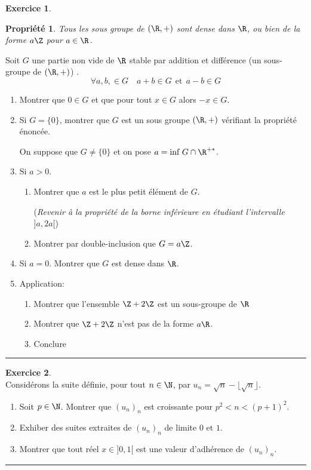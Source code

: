 \documentclass[a4paper,11pt]{article}
\newtheorem{prop}{Propriété}
\theoremstyle{definition}
\newtheorem{exo}{Exercice} %
\begin{document}
		\begin{exo}%
		\begin{prop}
			\textit{Tous les sous groupe de} $(\R, +)$ \textit{sont dense dans $\R$, ou bien de la forme} $a\Z$ \textit{pour} $a\in \R$.\\
		\end{prop}
		
		Soit $G$ une partie non vide de $\R$ stable par addition et diﬀérence (un sous-groupe de $(\R, +)$) .\hfil\\[-0.5cm] $$\forall a,b,\in G \quad a+b \in G \ \  \text{et} \ \ a-b \in G$$
		\begin{enumerate}
			\item Montrer que $0\in G$ et que pour tout $x\in G$ alors $-x\in G$.
			\item Si $G = \{0\}$, montrer que $G$ est un sous groupe $(\R, +)$ vérifiant la propriété énoncée.
			
			On suppose que $G \neq \{0\}$ et on pose $a = \text{inf } G\cap \R^{+*}$.
			\item Si $a>0$.
			\begin{enumerate}
				\item Montrer que $a$ est le plus petit élément de $G$. 
				
				(\textit{Revenir à la propriété de la borne inférieure en étudiant l'intervalle} $]a,2a[$)
				\item Montrer par double-inclusion que $G = a\Z$.
			\end{enumerate}
			\item Si $a=0$. Montrer que $G$ est dense dans $\R$.
			\item Application:
			\begin{enumerate}
				\item Montrer que l'ensemble $\Z + 2\Z$ est un sous-groupe de $\R$
				\item Montrer que $\Z + 2\Z$ n'est pas de la forme $a\R$.
				\item Conclure 
			\end{enumerate}
			
		\end{enumerate}
		\centering
		\rule{1\linewidth}{0.6pt}
	\end{exo}

	\begin{exo}\textit{}\quad\\[0.25cm]
	Considérons la suite définie, pour tout $n \in \N$, par \quad $u_n = \sqrt{n}-\lfloor\sqrt{n}\rfloor$.
	
	\begin{enumerate}
		\item Soit $p \in \N$. Montrer que $(u_n )_n$ est croissante pour $p^2 < n < (p + 1)^2 $.
		\item Exhiber des suites extraites de $(u_n)_n$ de limite $0$ et $1$.
		\item Montrer que tout réel $x \in]0, 1[$ est une valeur d'adhérence de $(u_n )_n$.
	\end{enumerate}
	\centering
	\rule{1\linewidth}{0.6pt}
	
	\end{exo}
\end{document}
